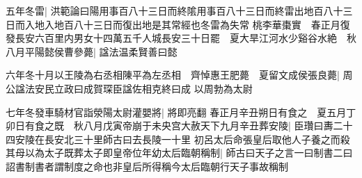 五年冬雷|{
	洪範論曰陽用事百八十三日而終隂用事百八十三日而終雷出地百八十三日而入地入地百八十三日而復出地是其常經也冬雷為失常}
桃李華棗實　春正月復發長安六百里内男女十四萬五千人城長安三十日罷　夏大旱江河水少谿谷水絶　秋八月平陽懿侯曹參薨|{
	諡法温柔賢善曰懿}


六年冬十月以王陵為右丞相陳平為左丞相　齊悼惠王肥薨　夏留文成侯張良薨|{
	周公諡法安民立政曰成賀琛臣諡佐相克終曰成}
以周勃為太尉

七年冬發車騎材官詣滎陽太尉灌嬰將|{
	將即亮翻}
春正月辛丑朔日有食之　夏五月丁卯日有食之既　秋八月戊寅帝崩于未央宫大赦天下九月辛丑葬安陵|{
	臣瓚曰夀二十四安陵在長安北三十里師古曰去長陵一十里}
初呂太后命張皇后取他人子養之而殺其母以為太子既葬太子即皇帝位年幼太后臨朝稱制|{
	師古曰天子之言一曰制書二曰詔書制書者謂制度之命也非皇后所得稱今太后臨朝行天子事故稱制}


